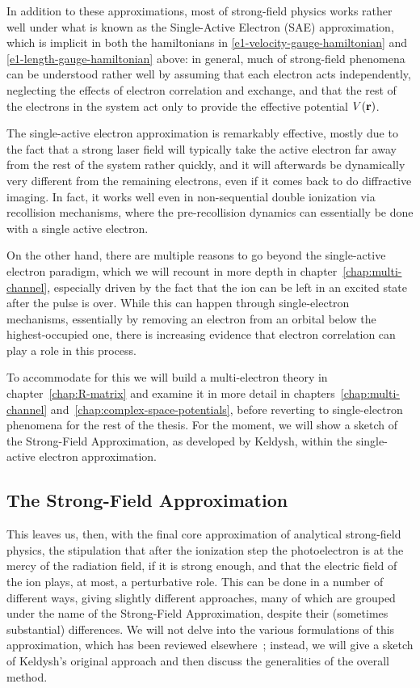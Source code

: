 In addition to these approximations, most of strong-field physics works rather well under what is known as the Single-Active Electron (SAE) approximation, which is implicit in both the hamiltonians in \eqref{e1-velocity-gauge-hamiltonian} and \eqref{e1-length-gauge-hamiltonian} above: in general, much of strong-field phenomena can be understood rather well by assuming that each electron acts independently, neglecting the effects of electron correlation and exchange, and that the rest of the electrons in the system act only to provide the effective potential $V(\vb{r})$.

The single-active electron approximation is remarkably effective, mostly due to the fact that a strong laser field will typically take the active electron far away from the rest of the system rather quickly, and it will afterwards be dynamically very different from the remaining electrons, even if it comes back to do diffractive imaging. In fact, it works well even in non-sequential double ionization via recollision mechanisms, where the pre-recollision dynamics can essentially be done with a single active electron.

On the other hand, there are multiple reasons to go beyond the single-active electron paradigm, which we will recount in more depth in chapter~\ref{chap:multi-channel}, especially driven by the fact that the ion can be left in an excited state after the pulse is over. While this can happen through single-electron mechanisms, essentially by removing an electron from an orbital below the highest-occupied one, there is increasing evidence that electron correlation can play a role in this process. 

To accommodate for this we will build a multi-electron theory in chapter~\ref{chap:R-matrix} and examine it in more detail in chapters~\ref{chap:multi-channel} and~\ref{chap:complex-space-potentials}, before reverting to single-electron phenomena for the rest of the thesis. For the moment, we will show a sketch of the Strong-Field Approximation, as developed by Keldysh, within the single-active electron approximation.



\subsection{The Strong-Field Approximation}


This leaves us, then, with the final core approximation of analytical strong-field physics, the stipulation that after the ionization step the photoelectron is at the mercy of the radiation field, if it is strong enough, and that the electric field of the ion plays, at most, a perturbative role. This can be done in a number of different ways, giving slightly different approaches, many of which are grouped under the name of the Strong-Field Approximation, despite their (sometimes substantial) differences. We will not delve into the various formulations of this approximation, which has been reviewed elsewhere~\cite{popruzhenko_Keldysh_theory, galstyan_sfa-reformulation_2016}; instead, we will give a sketch of Keldysh's original approach and then discuss the generalities of the overall method.


